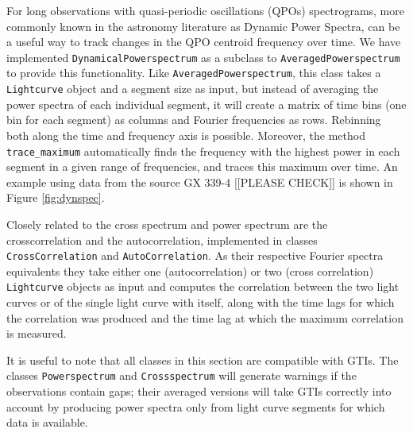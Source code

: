 \documentclass[twocolumn]{aastex62}
\newcommand{\lightcurve}{\texttt{Lightcurve}\xspace}
\newcommand{\crossspectrum}{\texttt{Crossspectrum}\xspace}
\newcommand{\powerspectrum}{\texttt{Powerspectrum}\xspace}
\begin{document}
For long observations with quasi-periodic oscillations (QPOs) spectrograms, more commonly known in the astronomy literature as Dynamic Power Spectra, can be a useful way to track changes in the QPO centroid frequency over time. We have implemented \texttt{DynamicalPowerspectrum} as a subclass to \texttt{AveragedPowerspectrum} to provide this functionality. Like \texttt{AveragedPowerspectrum}, this class takes a \lightcurve object and a segment size as input, but instead of averaging the power spectra of each individual segment, it will create a matrix of time bins (one bin for each segment) as columns and Fourier frequencies as rows. Rebinning both along the time and frequency axis is possible. Moreover, the method \texttt{trace\_maximum} automatically finds the frequency with the highest power in each segment in a given range of frequencies, and traces this maximum over time. An example using data from the source GX 339-4 [[PLEASE CHECK]] is shown in Figure \ref{fig:dynspec}.

Closely related to the cross spectrum and power spectrum are the crosscorrelation and the autocorrelation, implemented in classes \texttt{CrossCorrelation} and \texttt{AutoCorrelation}. As their respective Fourier spectra equivalents they take either one (autocorrelation) or two (cross correlation) \lightcurve objects as input and computes the correlation between the two light curves or of the single light curve with itself, along with the time lags for which the correlation was produced and the time lag at which the maximum correlation is measured.

It is useful to note that all classes in this section are compatible with GTIs. The classes \powerspectrum and \crossspectrum will generate warnings if the observations contain gaps; their averaged versions will take GTIs correctly into account by producing power spectra only from light curve segments for which data is available. 

\end{document}
